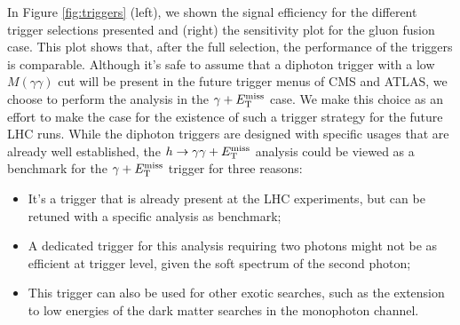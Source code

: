 In Figure \ref{fig:triggers} (left), we shown the signal efficiency for the different trigger selections presented and (right) the sensitivity plot for the gluon fusion case.
This plot shows that, after the full selection, the performance of the triggers is comparable. Although it's safe to assume that a diphoton trigger with a low $M(\gamma\gamma)$ cut will be present in the future trigger menus of CMS and ATLAS, we choose to perform the analysis in the $\gamma+E_{\mathrm{T}}^{\text{miss}}$ case. We make this choice as an effort to make the case for the existence of such a trigger strategy for the future LHC runs. While the diphoton triggers are designed with specific usages that are already well established, the $h\rightarrow\gamma\gamma+E_{\mathrm{T}}^{\text{miss}}$ analysis could be viewed as a benchmark for the $\gamma+E_{\mathrm{T}}^{\text{miss}}$ trigger for three reasons:
\begin{itemize}
    \item It's a trigger that is already present at the LHC experiments, but can be retuned with a specific analysis as benchmark;
    \item A dedicated trigger for this analysis requiring two photons might not be as efficient at trigger level, given the soft spectrum of the second photon;
    \item This trigger can also be used for other exotic searches, such as the extension to low energies of the dark matter searches in the monophoton channel.
\end{itemize}

